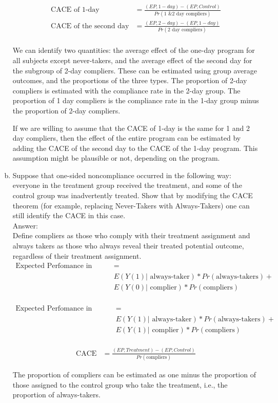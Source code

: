 \documentclass[11pt,notitlepage]{article}\usepackage[]{graphicx}\usepackage[]{color}
\begin{document}
\begin{enumerate}[a)]
\begin{align*}
\text{CACE of 1-day} &= \frac{(EP, 1-day) - (EP, Control)}{Pr(\text{1 \& 2 day compliers})} \\
\text{CACE of the second day} &= \frac{(EP, 2-day) - (EP, 1-day)}{Pr(\text{2 day compliers})} \\
\end{align*}

We can identify two quantities: the average effect of the one-day program for all subjects except never-takers, and the average effect of the second day for the subgroup of 2-day compliers.  These can be estimated using group average outcomes, and the proportions of the three types. The proportion of 2-day compliers is estimated with the compliance rate in the 2-day group. The proportion of 1 day compliers is the compliance rate in the 1-day group minus the proportion of 2-day compliers.

If we are willing to assume that the CACE of 1-day is the same for 1 and 2 day compliers, then the effect of the entire program can be estimated by adding the CACE of the second day to the CACE of the 1-day program. This assumption might be plausible or not, depending on the program.

\item Suppose that one-sided noncompliance occurred in the following way: everyone in the treatment group received the treatment, and some of the control group was inadvertently treated. Show that by modifying the CACE theorem (for example, replacing Never-Takers with Always-Takers) one can still identify the CACE in this case.\\
Answer:\\
Define compliers as those who comply with their treatment assignment and always takers as those who always reveal their treated potential outcome, regardless of their treatment assignment.
\begin{align*}
\text{Expected Perfomance in Control (EP, Control)} &= \\
&E(Y(1)|\text{ always-taker})*Pr(\text{always-takers}) + \\
&E(Y(0)|\text{ complier})*Pr(\text{compliers})\\
\end{align*}

\begin{align*}
\text{Expected Perfomance in Treatment (EP, Treatment)} &= \\
&E(Y(1)|\text{ always-taker})*Pr(\text{always-takers}) + \\
&E(Y(1)|\text{ complier})*Pr(\text{compliers})\\
\end{align*}

\begin{align*}
\text{CACE} &= \frac{(EP, Treatment) - (EP, Control)}{Pr(\text{compliers})}
\end{align*}

The proportion of compliers can be estimated as one minus the proportion of those assigned to the control group who take the treatment, i.e., the proportion of always-takers.

\end{enumerate}
\end{document}
